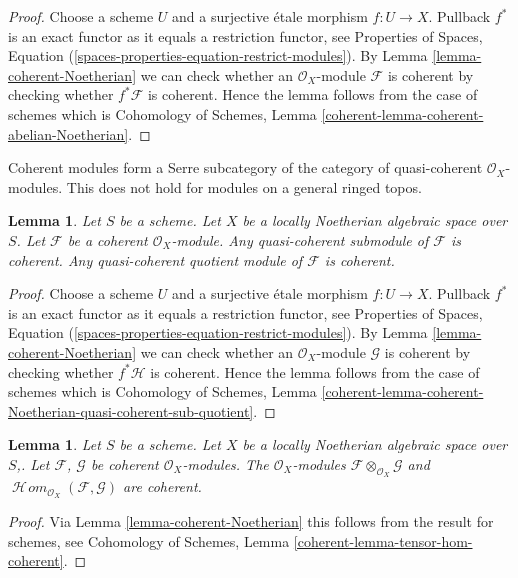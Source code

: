 \documentclass{stacks-project}
\theoremstyle{plain}
\newtheorem{lemma}[subsection]{Lemma}
\theoremstyle{definition}
\theoremstyle{remark}
\numberwithin{equation}{subsection}
\def\SheafHom{\mathop{\mathcal{H}\!\mathit{om}}\nolimits}
\begin{document}
\begin{proof}
Choose a scheme $U$ and a surjective \'etale morphism $f : U \to X$.
Pullback $f^*$ is an exact functor as it equals a restriction functor, see
Properties of Spaces, Equation
(\ref{spaces-properties-equation-restrict-modules}).
By
Lemma \ref{lemma-coherent-Noetherian} we can check whether an
$\mathcal{O}_X$-module $\mathcal{F}$ is
coherent by checking whether $f^*\mathcal{F}$ is coherent. Hence the
lemma follows from the case of schemes which is
Cohomology of Schemes, Lemma \ref{coherent-lemma-coherent-abelian-Noetherian}.
\end{proof}

\noindent
Coherent modules form a Serre subcategory of the
category of quasi-coherent $\mathcal{O}_X$-modules. This does not hold
for modules on a general ringed topos.

\begin{lemma}
\label{lemma-coherent-Noetherian-quasi-coherent-sub-quotient}
Let $S$ be a scheme.
Let $X$ be a locally Noetherian algebraic space over $S$.
Let $\mathcal{F}$ be a coherent $\mathcal{O}_X$-module.
Any quasi-coherent submodule of $\mathcal{F}$ is coherent.
Any quasi-coherent quotient module of $\mathcal{F}$ is coherent.
\end{lemma}

\begin{proof}
Choose a scheme $U$ and a surjective \'etale morphism $f : U \to X$.
Pullback $f^*$ is an exact functor as it equals a restriction functor, see
Properties of Spaces, Equation
(\ref{spaces-properties-equation-restrict-modules}).
By
Lemma \ref{lemma-coherent-Noetherian} we can check whether an
$\mathcal{O}_X$-module $\mathcal{G}$ is
coherent by checking whether $f^*\mathcal{H}$ is coherent. Hence the
lemma follows from the case of schemes which is
Cohomology of Schemes, Lemma
\ref{coherent-lemma-coherent-Noetherian-quasi-coherent-sub-quotient}.
\end{proof}

\begin{lemma}
\label{lemma-tensor-hom-coherent}
Let $S$ be a scheme.
Let $X$ be a locally Noetherian algebraic space over $S$,.
Let $\mathcal{F}$, $\mathcal{G}$ be coherent $\mathcal{O}_X$-modules.
The $\mathcal{O}_X$-modules $\mathcal{F} \otimes_{\mathcal{O}_X} \mathcal{G}$
and $\SheafHom_{\mathcal{O}_X}(\mathcal{F}, \mathcal{G})$ are
coherent.
\end{lemma}

\begin{proof}
Via Lemma \ref{lemma-coherent-Noetherian} this follows from the result
for schemes, see
Cohomology of Schemes, Lemma \ref{coherent-lemma-tensor-hom-coherent}.
\end{proof}
\end{document}

